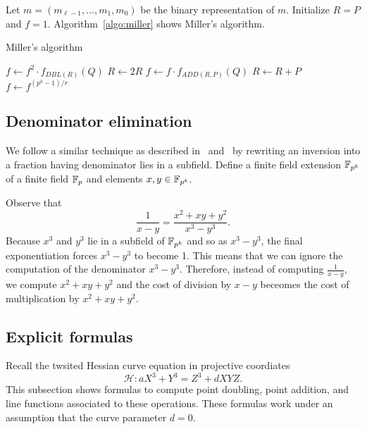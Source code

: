 Let $m = (m_{\ell-1}, \dots, m_1, m_0)$ be the binary representation of $m$.
Initialize $R = P$ and $f = 1$.
Algorithm~\ref{algo:miller} shows Miller's algorithm.
\begin{algorithm}
\caption{Miller's algorithm}
\label{algo:miller}
\begin{algorithmic}[1]


		\State $f \leftarrow f^2 \cdot f_{DBL(R)}(Q)$
		\State $R \leftarrow 2R$
			\State $f \leftarrow f \cdot f_{ADD(R,P)}(Q)$
			\State $R \leftarrow R+P$
		\EndIf
	\EndFor
	\State $f \leftarrow f^{(p^k-1)/r}$

\end{algorithmic}
\end{algorithm}


\subsection{Denominator elimination}
We follow a similar technique as described in~\cite{2008/lin} and~\cite{2009/deg15}
by rewriting an inversion into a fraction having denominator lies in a subfield.
Define a finite field extension $\mathbb{F}_{p^k}$ of a finite field $\mathbb{F}_{p}$
and elements $x,y \in \mathbb{F}_{p^k}$.

Observe that
$$ \frac{1}{x-y} = \frac{x^2 + xy + y^2}{x^3 - y^3}. $$
Because $x^3$ and $y^3$ lie in a subfield of $\mathbb{F}_{p^k}$ and so as $x^3 - y^3$,
the final exponentiation forces $x^3 - y^3$ to become 1.
This means that we can ignore the computation of the denominator $x^3 - y^3$.
Therefore, instead of computing $\frac{1}{x-y}$,
we compute $x^2 + xy + y^2$
and the cost of division by $x - y$ beceomes the cost of multiplication by $x^2 + xy + y^2$.


\subsection{Explicit formulas}

Recall the twsited Hessian curve equation in projective coordiates
$$ \mathcal{H}: a X^3 + Y^3 = Z^3 + d X Y Z. $$
This subsection shows formulas to compute point doubling, point addition, and line functions associated to these operations.
These formulas work under an assumption that the curve parameter $d = 0$.

